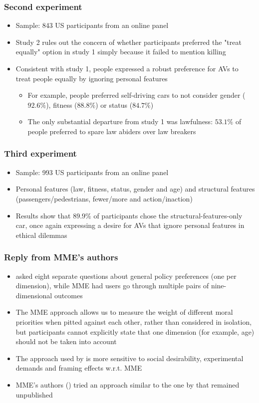 \documentclass[aspectratio=169]{beamer}
\begin{document}
\begin{frame}
    \frametitle{Second experiment}
    \begin{itemize}
        \item Sample: \num{843} US participants from an online panel
        \item Study 2 rules out the concern of whether participants preferred the "treat equally" option in study 1 simply because it failed to mention killing
        \item Consistent with study 1, people expressed a robust preference for AVs to treat people equally by ignoring personal features
              \begin{itemize}
                  \item For example, people preferred self-driving cars to not consider gender ($92.6\%$), fitness ($88.8\%$) or status ($84.7\%$)
                  \item The only substantial departure from study 1 was lawfulness: $53.1\%$ of people preferred to spare law abiders over law breakers
              \end{itemize}
    \end{itemize}
\end{frame}

\begin{frame}
    \frametitle{Third experiment}
    \begin{itemize}
        \item Sample: \num{993} US participants from an online panel
        \item Personal features (law, fitness, status, gender and age) and structural features (passengers/pedestrians, fewer/more and action/inaction)
        \item Results show that $89.9\%$ of participants chose the structural-features-only car, once again expressing a desire for AVs that ignore personal features in ethical dilemmas
    \end{itemize}
\end{frame}

\begin{frame}
    \frametitle{Reply from MME's authors}
    \begin{itemize}
        \item \citeauthor{against-mme} asked eight separate questions about general policy preferences (one per dimension), while MME had users go through multiple pairs of nine-dimensional outcomes
        \item The MME approach allows us to measure the weight of different moral priorities when pitted against each other, rather than considered in isolation, but participants cannot explicitly state that one dimension (for example, age) should not be taken into account
        \item The approach used by \citeauthor{against-mme} is more sensitive to social desirability, experimental demands and framing effects w.r.t. MME
        \item MME's authors (\citeauthor{mme}) tried an approach similar to the one by \citeauthor{against-mme} that remained unpublished \cite{reply-against-mme}
    \end{itemize}
\end{frame}
\end{document}
